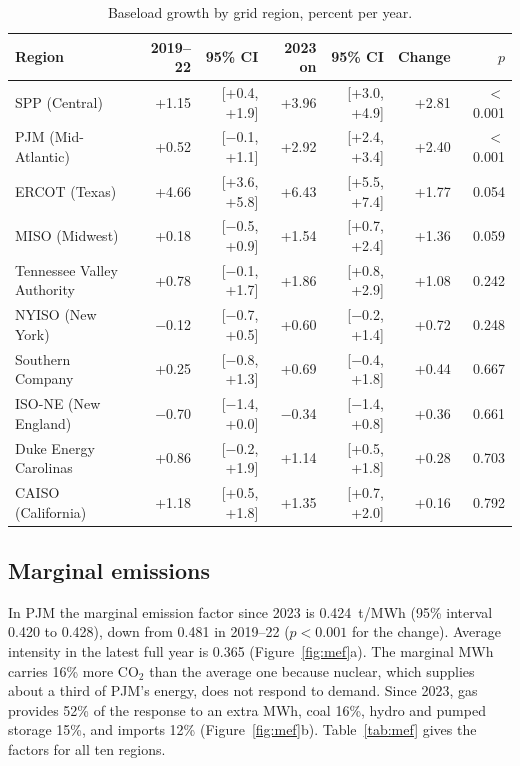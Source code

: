 \documentclass[11pt,a4paper]{article}
\begin{document}
\begin{table}[H]
\centering\footnotesize
\caption{Baseload growth by grid region, percent per year.}\label{tab:regions}
\begin{tabular}{lrrrrrr}
\toprule
Region & 2019--22 & 95\% CI & 2023 on & 95\% CI & Change & $p$ \\
\midrule
SPP (Central) & +1.15 & [+0.4, +1.9] & +3.96 & [+3.0, +4.9] & +2.81 & $<$0.001 \\
PJM (Mid-Atlantic) & +0.52 & [$-$0.1, +1.1] & +2.92 & [+2.4, +3.4] & +2.40 & $<$0.001 \\
ERCOT (Texas) & +4.66 & [+3.6, +5.8] & +6.43 & [+5.5, +7.4] & +1.77 & 0.054 \\
MISO (Midwest) & +0.18 & [$-$0.5, +0.9] & +1.54 & [+0.7, +2.4] & +1.36 & 0.059 \\
Tennessee Valley Authority & +0.78 & [$-$0.1, +1.7] & +1.86 & [+0.8, +2.9] & +1.08 & 0.242 \\
NYISO (New York) & $-$0.12 & [$-$0.7, +0.5] & +0.60 & [$-$0.2, +1.4] & +0.72 & 0.248 \\
Southern Company & +0.25 & [$-$0.8, +1.3] & +0.69 & [$-$0.4, +1.8] & +0.44 & 0.667 \\
ISO-NE (New England) & $-$0.70 & [$-$1.4, +0.0] & $-$0.34 & [$-$1.4, +0.8] & +0.36 & 0.661 \\
Duke Energy Carolinas & +0.86 & [$-$0.2, +1.9] & +1.14 & [+0.5, +1.8] & +0.28 & 0.703 \\
CAISO (California) & +1.18 & [+0.5, +1.8] & +1.35 & [+0.7, +2.0] & +0.16 & 0.792 \\
\bottomrule
\end{tabular}
\end{table}


\subsection{Marginal emissions}\label{sec:mef}
In PJM the marginal emission factor since 2023 is 0.424~t/MWh (95\% interval 0.420 to 0.428), down from 0.481 in 2019--22 ($p<0.001$ for the change). Average intensity in the latest full year is 0.365 (Figure~\ref{fig:mef}a). The marginal MWh carries 16\% more CO$_2$ than the average one because nuclear, which supplies about a third of PJM's energy, does not respond to demand. Since 2023, gas provides 52\% of the response to an extra MWh, coal 16\%, hydro and pumped storage 15\%, and imports 12\% (Figure~\ref{fig:mef}b). Table~\ref{tab:mef} gives the factors for all ten regions.
\end{document}
